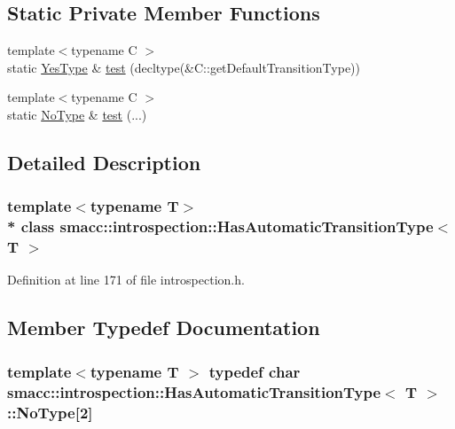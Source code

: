 \subsection*{Static Private Member Functions}
\begin{DoxyCompactItemize}
\item 
{\footnotesize template$<$typename C $>$ }\\static \hyperlink{classsmacc_1_1introspection_1_1HasAutomaticTransitionType_abeb599df547eb3db36684b6cb343eade}{Yes\+Type} \& \hyperlink{classsmacc_1_1introspection_1_1HasAutomaticTransitionType_a3521b68e2adb57520d3ca8cfbea082fb}{test} (decltype(\&C\+::get\+Default\+Transition\+Type))
\item 
{\footnotesize template$<$typename C $>$ }\\static \hyperlink{classsmacc_1_1introspection_1_1HasAutomaticTransitionType_aa2e976214fc770f53aaae67fc049caab}{No\+Type} \& \hyperlink{classsmacc_1_1introspection_1_1HasAutomaticTransitionType_a660ac4a6eac5d86d133f2cfb905d22f3}{test} (...)
\end{DoxyCompactItemize}


\subsection{Detailed Description}
\subsubsection*{template$<$typename T$>$\\*
class smacc\+::introspection\+::\+Has\+Automatic\+Transition\+Type$<$ T $>$}



Definition at line 171 of file introspection.\+h.



\subsection{Member Typedef Documentation}
\subsubsection[{\texorpdfstring{No\+Type}{NoType}}]{\setlength{\rightskip}{0pt plus 5cm}template$<$typename T $>$ typedef char {\bf smacc\+::introspection\+::\+Has\+Automatic\+Transition\+Type}$<$ T $>$\+::No\+Type\mbox{[}2\mbox{]}\hspace{0.3cm}{\ttfamily [private]}}\hypertarget{classsmacc_1_1introspection_1_1HasAutomaticTransitionType_aa2e976214fc770f53aaae67fc049caab}{}\label{classsmacc_1_1introspection_1_1HasAutomaticTransitionType_aa2e976214fc770f53aaae67fc049caab}


